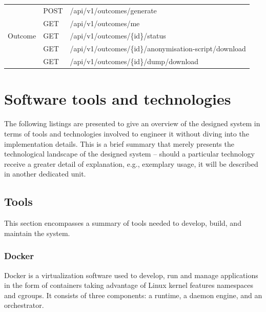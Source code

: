 \documentclass[a4paper,twoside,12pt]{book}
\begin{document}
\begin{table}[]
\begin{tabular}{|c|l|l|}
\multicolumn{1}{|c|}{\multirow{5}{*}{Outcome}}                     & \multicolumn{1}{l|}{POST}           & /api/v1/outcomes/generate  \\
\multicolumn{1}{|c|}{}                                             & \multicolumn{1}{l|}{GET}            & /api/v1/outcomes/me \\
\multicolumn{1}{|c|}{}                                             & \multicolumn{1}{l|}{GET}            & /api/v1/outcomes/\{id\}/status \\  
\multicolumn{1}{|c|}{}                                             & \multicolumn{1}{l|}{GET}            & \footnotesize /api/v1/outcomes/\{id\}/anonymisation-script/download \\ 
\multicolumn{1}{|c|}{}                                             & \multicolumn{1}{l|}{GET}            & /api/v1/outcomes/\{id\}/dump/download \\ \hline

\end{tabular}
\end{table}

\section{Software tools and technologies}

The following listings are presented to give an overview of the designed system in terms of tools and technologies involved to engineer it without diving into the implementation details. This is a brief summary that merely presents the technological landscape of the designed system – should a particular technology receive a greater detail of explanation, e.g., exemplary usage, it will be described in another dedicated unit.

\subsection{Tools}

This section encompasses a summary of tools needed to develop, build, and maintain the system.

\subsubsection{Docker}

Docker is a virtualization software used to develop, run and manage applications in the form of containers taking advantage of Linux kernel features namespaces and cgroups. It consists of three components: a runtime, a daemon engine, and an orchestrator. 
\end{document}
